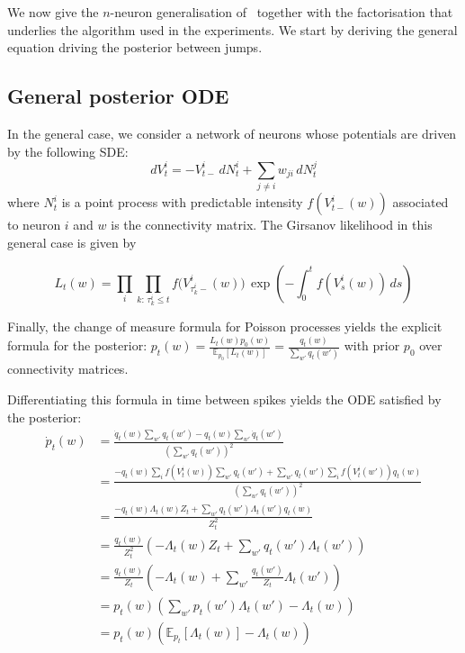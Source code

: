 \documentclass[11pt,a4paper]{article}
\theoremstyle{definition}
\begin{document}
We now give the $n$-neuron generalisation of~
together with the factorisation that underlies the algorithm used in
the experiments. We start by deriving the general equation driving the posterior between jumps.

\subsection{General posterior ODE}
\label{subsec:general-ode}

In the general case, we consider a network of neurons whose potentials are driven by the following SDE:
$$
dV_t^i = -V_{t-}^i\, dN_t^i + \sum_{j \neq i} w_{j i}\, dN_t^j
$$
where $N_t^i$ is a point process with predictable intensity $f(V_{t-}^i(w))$ associated to neuron $i$ and $w$ is the connectivity matrix. The Girsanov likelihood in this general case is given by

$$
L_t (w) = \prod_i \prod_{k:\,\tau_k^i \le t} f\bigl(V_{\tau_k^i-}^i (w)\bigr)\, \exp \left( -\int_0^t f(V_s^i (w))\, ds \right)
$$

Finally, the change of measure formula for Poisson processes yields the explicit formula for the posterior:
$
p_t(w) = \frac{L_t(w) p_0 (w)}{\mathbb{E}_{p_0}[L_t (w)]} = \frac{q_t (w)}{\sum_{w'} q_t (w')}
$
with prior $p_0$ over connectivity matrices.

Differentiating this formula in time between spikes yields the ODE satisfied by the posterior:
\begin{align*}
    \dot{p}_t (w) &= \frac{\dot{q}_t (w) \sum_{w'} q_t (w') - q_t (w) \sum_{w'} \dot{q}_t (w')}{\left( \sum_{w'} q_t (w') \right)^2} \\
    &= \frac{-q_t (w) \sum_i f(V_t^i (w)) \sum_{w'} q_t (w') + \sum_{w'} q_t(w') \sum_i f(V_t^i (w')) q_t(w)}{\left( \sum_{w'} q_t (w') \right)^2} \\
    &= \frac{-q_t(w) \Lambda_t (w) Z_t + \sum_{w'} q_t(w') \Lambda_t (w') q_t(w)}{Z_t^2} \\
    &= \frac{q_t(w)}{Z_t^2} \left( -\Lambda_t(w) Z_t + \sum_{w'} q_t(w') \Lambda_t (w') \right) \\
    &= \frac{q_t (w)}{Z_t} \left( -\Lambda_t(w) + \sum_{w'} \frac{q_t(w')}{Z_t} \Lambda_t (w') \right) \\
    &= p_t (w) \left( \sum_{w'} p_t (w') \Lambda_t (w') - \Lambda_t(w) \right) \\
    &= p_t(w) \left( \mathbb{E}_{p_t}[\Lambda_t (w)] - \Lambda_t(w) \right)
\end{align*}
\end{document}
